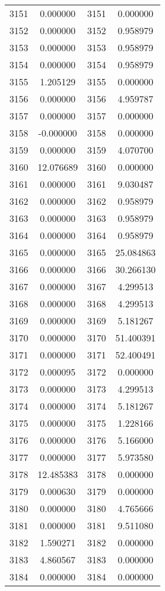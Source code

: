 \documentclass[12pt]{article}
\begin{document}
\begin{longtable}{@{}cccc@{}}
3151 & 0.000000 & 3151 & 0.000000 \\
3152 & 0.000000 & 3152 & 0.958979 \\
3153 & 0.000000 & 3153 & 0.958979 \\
3154 & 0.000000 & 3154 & 0.958979 \\
3155 & 1.205129 & 3155 & 0.000000 \\
3156 & 0.000000 & 3156 & 4.959787 \\
3157 & 0.000000 & 3157 & 0.000000 \\
3158 & -0.000000 & 3158 & 0.000000 \\
3159 & 0.000000 & 3159 & 4.070700 \\
3160 & 12.076689 & 3160 & 0.000000 \\
3161 & 0.000000 & 3161 & 9.030487 \\
3162 & 0.000000 & 3162 & 0.958979 \\
3163 & 0.000000 & 3163 & 0.958979 \\
3164 & 0.000000 & 3164 & 0.958979 \\
3165 & 0.000000 & 3165 & 25.084863 \\
3166 & 0.000000 & 3166 & 30.266130 \\
3167 & 0.000000 & 3167 & 4.299513 \\
3168 & 0.000000 & 3168 & 4.299513 \\
3169 & 0.000000 & 3169 & 5.181267 \\
3170 & 0.000000 & 3170 & 51.400391 \\
3171 & 0.000000 & 3171 & 52.400491 \\
3172 & 0.000095 & 3172 & 0.000000 \\
3173 & 0.000000 & 3173 & 4.299513 \\
3174 & 0.000000 & 3174 & 5.181267 \\
3175 & 0.000000 & 3175 & 1.228166 \\
3176 & 0.000000 & 3176 & 5.166000 \\
3177 & 0.000000 & 3177 & 5.973580 \\
3178 & 12.485383 & 3178 & 0.000000 \\
3179 & 0.000630 & 3179 & 0.000000 \\
3180 & 0.000000 & 3180 & 4.765666 \\
3181 & 0.000000 & 3181 & 9.511080 \\
3182 & 1.590271 & 3182 & 0.000000 \\
3183 & 4.860567 & 3183 & 0.000000 \\
3184 & 0.000000 & 3184 & 0.000000 \\

\end{longtable}
\end{document}
